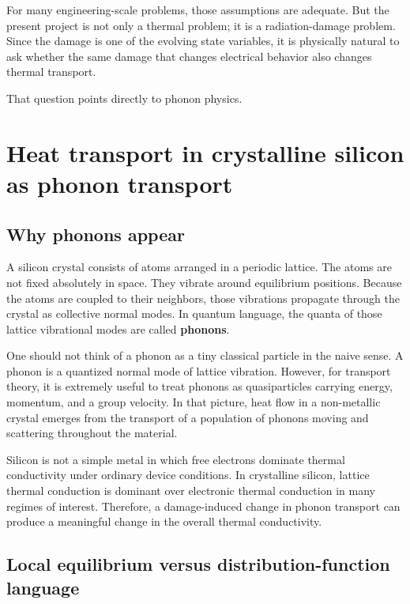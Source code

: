 \documentclass[11pt]{article}
\begin{document}
For many engineering-scale problems, those assumptions are adequate. But the present project is not only a thermal problem; it is a radiation-damage problem. Since the damage is one of the evolving state variables, it is physically natural to ask whether the same damage that changes electrical behavior also changes thermal transport.

That question points directly to phonon physics.

\section{Heat transport in crystalline silicon as phonon transport}

\subsection{Why phonons appear}

A silicon crystal consists of atoms arranged in a periodic lattice. The atoms are not fixed absolutely in space. They vibrate around equilibrium positions. Because the atoms are coupled to their neighbors, those vibrations propagate through the crystal as collective normal modes. In quantum language, the quanta of those lattice vibrational modes are called \textbf{phonons}.

One should not think of a phonon as a tiny classical particle in the naive sense. A phonon is a quantized normal mode of lattice vibration. However, for transport theory, it is extremely useful to treat phonons as quasiparticles carrying energy, momentum, and a group velocity. In that picture, heat flow in a non-metallic crystal emerges from the transport of a population of phonons moving and scattering throughout the material.

Silicon is not a simple metal in which free electrons dominate thermal conductivity under ordinary device conditions. In crystalline silicon, lattice thermal conduction is dominant over electronic thermal conduction in many regimes of interest. Therefore, a damage-induced change in phonon transport can produce a meaningful change in the overall thermal conductivity.

\subsection{Local equilibrium versus distribution-function language}
\end{document}
